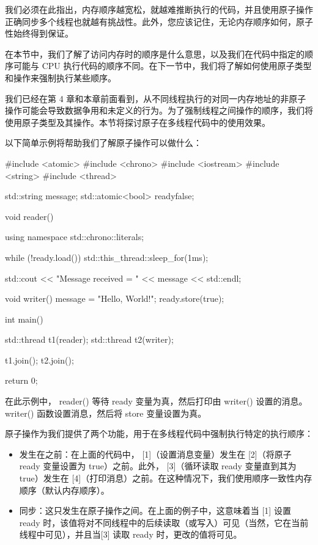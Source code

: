 我们必须在此指出，内存顺序越宽松，就越难推断执行的代码，并且使用原子操作正确同步多个线程也就越有挑战性。此外，您应该记住，无论内存顺序如何，原子性始终得到保证。

在本节中，我们了解了访问内存时的顺序是什么意思，以及我们在代码中指定的顺序可能与 CPU 执行代码的顺序不同。在下一节中，我们将了解如何使用原子类型和操作来强制执行某些顺序。


我们已经在第 4 章和本章前面看到，从不同线程执行的对同一内存地址的非原子操作可能会导致数据争用和未定义的行为。为了强制线程之间操作的顺序，我们将使用原子类型及其操作。本节将探讨原子在多线程代码中的使用效果。

以下简单示例将帮助我们了解原子操作可以做什么：

\begin{cpp}
#include <atomic>
#include <chrono>
#include <iostream>
#include <string>
#include <thread>

std::string message;
std::atomic<bool> ready{false};

void reader() {
    using namespace std::chrono::literals;

    while (!ready.load()) {
        std::this_thread::sleep_for(1ms);
    }

    std::cout << "Message received = " << message << std::endl;
}

void writer() {
    message = "Hello, World!";
    ready.store(true);
}

int main() {
    std::thread t1(reader);
    std::thread t2(writer);

    t1.join();
    t2.join();

    return 0;
}
\end{cpp}

在此示例中， reader() 等待 ready 变量为真，然后打印由 writer() 设置的消息。 writer() 函数设置消息，然后将 store 变量设置为真。

原子操作为我们提供了两个功能，用于在多线程代码中强制执行特定的执行顺序：

\begin{itemize}
\item
发生在之前：在上面的代码中， [1]（设置消息变量）发生在 [2]（将原子 ready 变量设置为 true）之前。此外， [3]（循环读取 ready 变量直到其为 true）发生在 [4]（打印消息）之前。在这种情况下，我们使用顺序一致性内存顺序（默认内存顺序）。

\item
同步：这只发生在原子操作之间。在上面的例子中，这意味着当 [1] 设置 ready 时，该值将对不同线程中的后续读取（或写入）可见（当然，它在当前线程中可见），并且当[3] 读取 ready 时，更改的值将可见。
\end{itemize}

